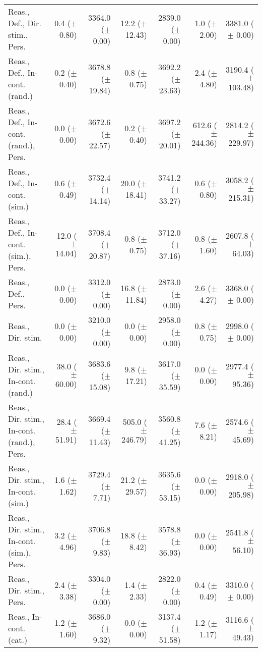 \begin{table*}
\begin{tabular}{lrrrrrr}
        Reas., Def., Dir. stim., Pers. & 0.4 ($\pm$ 0.80) & 3364.0 ($\pm$ 0.00) & 12.2 ($\pm$ 12.43) & 2839.0 ($\pm$ 0.00) & 1.0 ($\pm$ 2.00) & 3381.0 ($\pm$ 0.00) \\
        Reas., Def., In-cont. (rand.) & 0.2 ($\pm$ 0.40) & 3678.8 ($\pm$ 19.84) & 0.8 ($\pm$ 0.75) & 3692.2 ($\pm$ 23.63) & 2.4 ($\pm$ 4.80) & 3190.4 ($\pm$ 103.48) \\
        Reas., Def., In-cont. (rand.), Pers. & 0.0 ($\pm$ 0.00) & 3672.6 ($\pm$ 22.57) & 0.2 ($\pm$ 0.40) & 3697.2 ($\pm$ 20.01) & 612.6 ($\pm$ 244.36) & 2814.2 ($\pm$ 229.97) \\
        Reas., Def., In-cont. (sim.) & 0.6 ($\pm$ 0.49) & 3732.4 ($\pm$ 14.14) & 20.0 ($\pm$ 18.41) & 3741.2 ($\pm$ 33.27) & 0.6 ($\pm$ 0.80) & 3058.2 ($\pm$ 215.31) \\
        Reas., Def., In-cont. (sim.), Pers. & 12.0 ($\pm$ 14.04) & 3708.4 ($\pm$ 20.87) & 0.8 ($\pm$ 0.75) & 3712.0 ($\pm$ 37.16) & 0.8 ($\pm$ 1.60) & 2607.8 ($\pm$ 64.03) \\
        Reas., Def., Pers. & 0.0 ($\pm$ 0.00) & 3312.0 ($\pm$ 0.00) & 16.8 ($\pm$ 11.84) & 2873.0 ($\pm$ 0.00) & 2.6 ($\pm$ 4.27) & 3368.0 ($\pm$ 0.00) \\
        Reas., Dir. stim. & 0.0 ($\pm$ 0.00) & 3210.0 ($\pm$ 0.00) & 0.0 ($\pm$ 0.00) & 2958.0 ($\pm$ 0.00) & 0.8 ($\pm$ 0.75) & 2998.0 ($\pm$ 0.00) \\
        Reas., Dir. stim., In-cont. (rand.) & 38.0 ($\pm$ 60.00) & 3683.6 ($\pm$ 15.08) & 9.8 ($\pm$ 17.21) & 3617.0 ($\pm$ 35.59) & 0.0 ($\pm$ 0.00) & 2977.4 ($\pm$ 95.36) \\
        Reas., Dir. stim., In-cont. (rand.), Pers. & 28.4 ($\pm$ 51.91) & 3669.4 ($\pm$ 11.43) & 505.0 ($\pm$ 246.79) & 3560.8 ($\pm$ 41.25) & 7.6 ($\pm$ 8.21) & 2574.6 ($\pm$ 45.69) \\
        Reas., Dir. stim., In-cont. (sim.) & 1.6 ($\pm$ 1.62) & 3729.4 ($\pm$ 7.71) & 21.2 ($\pm$ 29.57) & 3635.6 ($\pm$ 53.15) & 0.0 ($\pm$ 0.00) & 2918.0 ($\pm$ 205.98) \\
        Reas., Dir. stim., In-cont. (sim.), Pers. & 3.2 ($\pm$ 4.96) & 3706.8 ($\pm$ 9.83) & 18.8 ($\pm$ 8.42) & 3578.8 ($\pm$ 36.93) & 0.0 ($\pm$ 0.00) & 2541.8 ($\pm$ 56.10) \\
        Reas., Dir. stim., Pers. & 2.4 ($\pm$ 3.38) & 3304.0 ($\pm$ 0.00) & 1.4 ($\pm$ 2.33) & 2822.0 ($\pm$ 0.00) & 0.4 ($\pm$ 0.49) & 3310.0 ($\pm$ 0.00) \\
        Reas., In-cont. (cat.) & 1.2 ($\pm$ 1.60) & 3686.0 ($\pm$ 9.32) & 0.0 ($\pm$ 0.00) & 3137.4 ($\pm$ 51.58) & 1.2 ($\pm$ 1.17) & 3116.6 ($\pm$ 49.43) \\

\end{tabular}
\end{table*}

